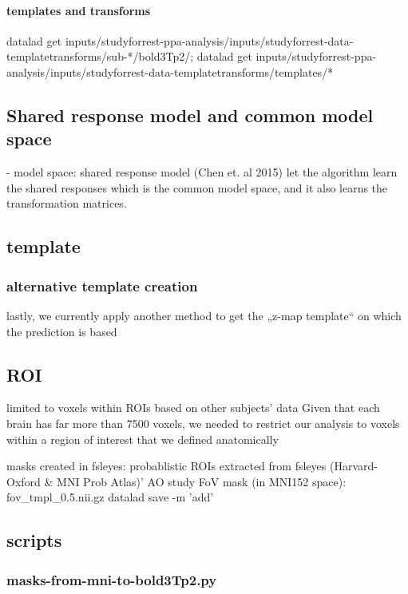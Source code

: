 \paragraph{templates and transforms}
%
datalad get
inputs/studyforrest-ppa-analysis/inputs/studyforrest-data-templatetransforms/sub-*/bold3Tp2/;
datalad get
inputs/studyforrest-ppa-analysis/inputs/studyforrest-data-templatetransforms/templates/*


\subsection{Shared response model and common model space}
\citep{chen2015reduced}
%
- model space: shared response model (Chen et. al 2015)
%
let the algorithm learn the shared responses which is the common model space,
and it also learns the transformation matrices.

\subsection{template}
%

\subsubsection{alternative template creation}
%
lastly, we currently apply another method to get the „z-map template“ on which
the prediction is based


\subsection{ROI}
%
limited to voxels within ROIs based on other subjects' data
%
Given that each brain has far more than 7500 voxels,
we needed to restrict our analysis to voxels within a region of interest
that we defined anatomically

masks created in fsleyes:
%
probablistic ROIs extracted from fsleyes (Harvard-Oxford \& MNI Prob Atlas)'
%
AO study FoV mask (in MNI152 space): fov\_tmpl\_0.5.nii.gz
datalad save -m 'add'


\subsection{scripts}


\subsubsection{masks-from-mni-to-bold3Tp2.py}

